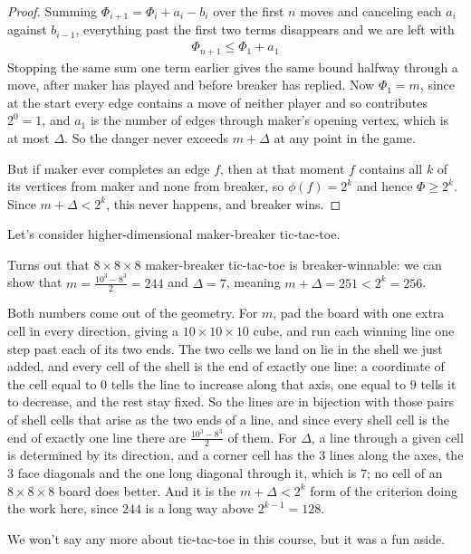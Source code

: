 \begin{proof}
    Summing $\Phi_{i + 1} = \Phi_i + a_i - b_i$ over the first $n$ moves and canceling each $a_i$ against $b_{i - 1}$, everything past the first two terms disappears and we are left with
    \begin{align*}
        \Phi_{n + 1} \leq \Phi_1 + a_1
    \end{align*}
    Stopping the same sum one term earlier gives the same bound halfway through a move, after maker has played and before breaker has replied. Now $\Phi_1 = m$, since at the start every edge contains a move of neither player and so contributes $2^0 = 1$, and $a_1$ is the number of edges through maker's opening vertex, which is at most $\Delta$. So the danger never exceeds $m + \Delta$ at any point in the game.

    But if maker ever completes an edge $f$, then at that moment $f$ contains all $k$ of its vertices from maker and none from breaker, so $\phi(f) = 2^k$ and hence $\Phi \geq 2^k$. Since $m + \Delta < 2^k$, this never happens, and breaker wins.
\end{proof}

Let's consider higher-dimensional maker-breaker tic-tac-toe.

\begin{boxexample}
    Turns out that $8 \times 8 \times 8$ maker-breaker tic-tac-toe is breaker-winnable: we can show that $m = \frac{10^3 - 8^3}{2} = 244$ and $\Delta = 7$, meaning $m + \Delta = 251 < 2^k = 256$.
\end{boxexample}

Both numbers come out of the geometry. For $m$, pad the board with one extra cell in every direction, giving a $10 \times 10 \times 10$ cube, and run each winning line one step past each of its two ends. The two cells we land on lie in the shell we just added, and every cell of the shell is the end of exactly one line: a coordinate of the cell equal to $0$ tells the line to increase along that axis, one equal to $9$ tells it to decrease, and the rest stay fixed. So the lines are in bijection with those pairs of shell cells that arise as the two ends of a line, and since every shell cell is the end of exactly one line there are $\frac{10^3 - 8^3}{2}$ of them. For $\Delta$, a line through a given cell is determined by its direction, and a corner cell has the $3$ lines along the axes, the $3$ face diagonals and the one long diagonal through it, which is $7$; no cell of an $8 \times 8 \times 8$ board does better. And it is the $m + \Delta < 2^k$ form of the criterion doing the work here, since $244$ is a long way above $2^{k - 1} = 128$.

We won't say any more about tic-tac-toe in this course, but it was a fun aside.
